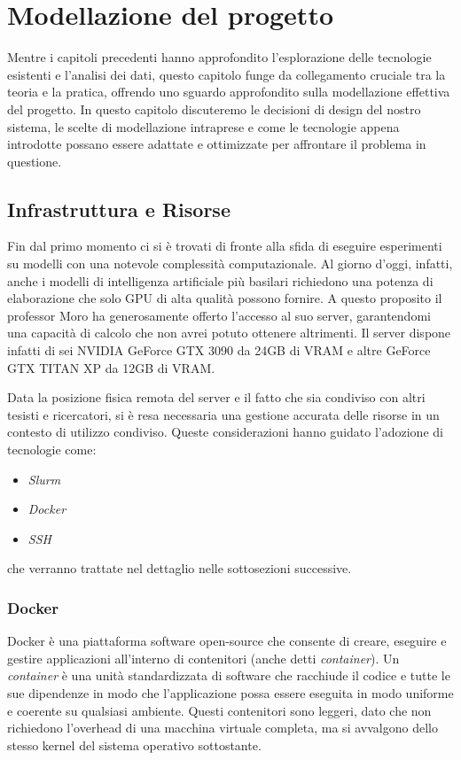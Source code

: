 \documentclass[12pt,a4paper,twoside,openright]{book}
\begin{document}
\chapter{Modellazione del progetto}
\label{cap:modellazione-prog}

Mentre i capitoli precedenti hanno approfondito l'esplorazione delle tecnologie esistenti e l'analisi dei dati, questo capitolo funge da collegamento cruciale tra la teoria e la pratica, offrendo uno sguardo approfondito sulla modellazione effettiva del progetto.
In questo capitolo discuteremo le decisioni di design del nostro sistema, le scelte di modellazione intraprese e come le tecnologie appena introdotte possano essere adattate e ottimizzate per affrontare il problema in questione. 


\section{Infrastruttura e Risorse}

Fin dal primo momento ci si è trovati di fronte alla sfida di eseguire esperimenti su modelli con una notevole complessità computazionale. 
Al giorno d'oggi, infatti, anche i modelli di intelligenza artificiale più basilari richiedono una potenza di elaborazione che solo GPU di alta qualità possono fornire.
A questo proposito il professor Moro ha generosamente offerto l'accesso al suo server, garantendomi una capacità di calcolo che non avrei potuto ottenere altrimenti.
Il server dispone infatti di sei NVIDIA GeForce GTX 3090 da 24GB di VRAM e altre GeForce GTX TITAN XP da 12GB di VRAM.

Data la posizione fisica remota del server e il fatto che sia condiviso con altri tesisti e ricercatori, si è resa necessaria una gestione accurata delle risorse in un contesto di utilizzo condiviso. Queste considerazioni hanno guidato l'adozione di tecnologie come:
\begin{itemize}
    \item \emph{Slurm}
    \item \emph{Docker}
    \item \emph{SSH}
\end{itemize}
che verranno trattate nel dettaglio nelle sottosezioni successive.

\subsection{Docker}

Docker è una piattaforma software open-source che consente di creare, eseguire e gestire applicazioni all'interno di contenitori (anche detti \emph{container}). Un \emph{container} è una unità standardizzata di software che racchiude il codice e tutte le sue dipendenze in modo che l'applicazione possa essere eseguita in modo uniforme e coerente su qualsiasi ambiente. Questi contenitori sono leggeri, dato che non richiedono l'overhead di una macchina virtuale completa, ma si avvalgono dello stesso kernel del sistema operativo sottostante. 
\end{document}
